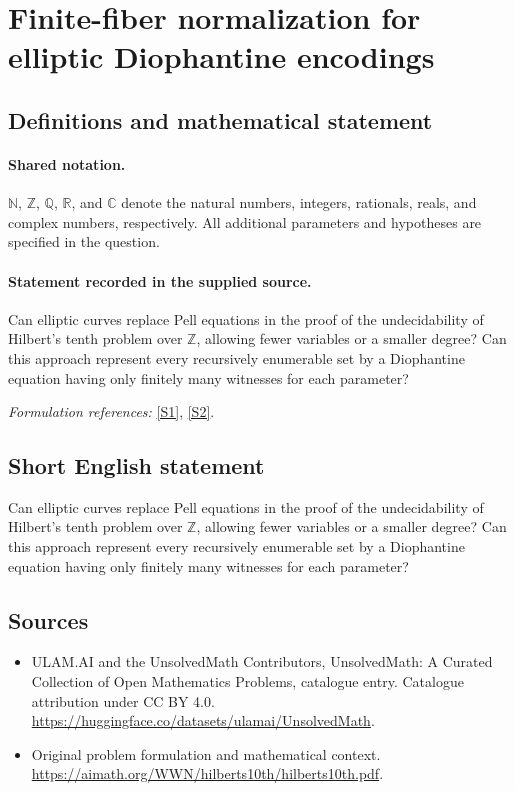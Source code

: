\documentclass[11pt]{article}
\newcommand{\sref}[2]{\hyperlink{source:#1:#2}{[S#2]}}
\begin{document}
\section{Finite-fiber normalization for elliptic Diophantine encodings}\label{statement}

\subsection{Definitions and mathematical statement}

\paragraph{Shared notation.}$\mathbb N$, $\mathbb Z$, $\mathbb Q$, $\mathbb R$, and $\mathbb C$ denote the natural numbers, integers, rationals, reals, and complex numbers, respectively. All additional parameters and hypotheses are specified in the question.


\paragraph{Statement recorded in the supplied source.}
Can elliptic curves replace Pell equations in the proof of the undecidability of Hilbert's tenth problem over $\mathbb Z$, allowing fewer variables or a smaller degree? Can this approach represent every recursively enumerable set by a Diophantine equation having only finitely many witnesses for each parameter?
\par\smallskip\textit{Formulation references:} \sref{statement}{1}, \sref{statement}{2}.
\subsection{Short English statement}
Can elliptic curves replace Pell equations in the proof of the undecidability of Hilbert's tenth problem over $\mathbb Z$, allowing fewer variables or a smaller degree? Can this approach represent every recursively enumerable set by a Diophantine equation having only finitely many witnesses for each parameter?
\subsection{Sources}
\begin{itemize}
\item[\hypertarget{source:statement:1}{S1}] ULAM.AI and the UnsolvedMath Contributors, UnsolvedMath: A Curated Collection of Open Mathematics Problems, catalogue entry. Catalogue attribution under CC BY 4.0.
\url{https://huggingface.co/datasets/ulamai/UnsolvedMath}.
\item[\hypertarget{source:statement:2}{S2}] Original problem formulation and mathematical context.
\url{https://aimath.org/WWN/hilberts10th/hilberts10th.pdf}.
\end{itemize}
\label{end:statement}
\end{document}
